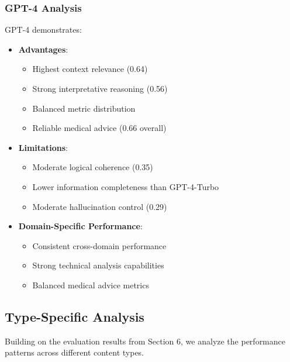 \subsubsection{GPT-4 Analysis}
GPT-4 demonstrates:
\begin{itemize}
    \item \textbf{Advantages}:
    \begin{itemize}
        \item Highest context relevance (0.64)
        \item Strong interpretative reasoning (0.56)
        \item Balanced metric distribution
        \item Reliable medical advice (0.66 overall)
    \end{itemize}
    \item \textbf{Limitations}:
    \begin{itemize}
        \item Moderate logical coherence (0.35)
        \item Lower information completeness than GPT-4-Turbo
        \item Moderate hallucination control (0.29)
    \end{itemize}
    \item \textbf{Domain-Specific Performance}:
    \begin{itemize}
        \item Consistent cross-domain performance
        \item Strong technical analysis capabilities
        \item Balanced medical advice metrics
    \end{itemize}
\end{itemize}

\subsection{Type-Specific Analysis}
Building on the evaluation results from Section 6, we analyze the performance patterns across different content types.

